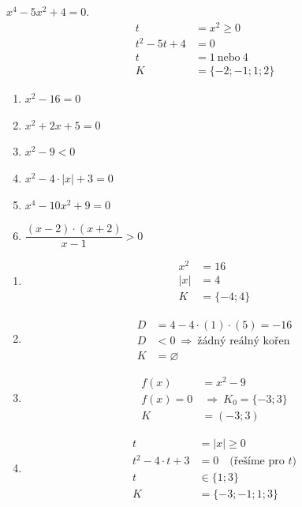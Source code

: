 \documentclass[11pt,a4paper]{article}
\begin{document}
\begin{zadaniReseniBox}[title={Rozšíření 2}]
$x^4-5x^2+4=0$.
\tcblower
\[\begin{aligned}
t&=x^2\ge0\\t^2-5t+4&=0\\t&=1\ \text{nebo}\ 4\\K&=\{-2;-1;1;2\}
\end{aligned}\]
\end{zadaniReseniBox}
\begin{zadaniReseniBox}[title={Domácí úkol}]
\begin{enumerate}[label=\alph*),itemsep=2pt]
\item $x^{2} - 16=0$
\item $x^{2} + 2x + 5=0$
\item $x^{2} - 9<0$
\item $x^{2} - 4 \cdot \left|{x}\right| + 3=0$
\item $x^{4} - 10x^{2} + 9=0$
\item $\dfrac{\left(x - 2\right) \cdot \left(x + 2\right)}{x - 1}>0$
\end{enumerate}
\tcblower
\begin{enumerate}[label=\alph*),itemsep=2pt]
\item
\[\begin{aligned}
x^2&=16\\|x|&=4\\[2pt]
K&=\{-4;4\}
\end{aligned}\]
\item
\[\begin{aligned}
D&=4-4\cdot(1)\cdot(5)=-16\\[2pt]
D&<0\ \Rightarrow\ \text{žádný reálný kořen}\\[2pt]
K&=\varnothing
\end{aligned}\]
\item
\[\begin{aligned}
f(x)&=x^{2} - 9\\[2pt]
f(x)=0&\ \Rightarrow\ K_0=\{-3;3\}\\[2pt]
K&=(-3;3)
\end{aligned}\]
\item
\[\begin{aligned}
t&=|x|\ge0\\[2pt]
t^{2} - 4 \cdot t + 3&=0\quad\text{(řešíme pro }t\text{)}\\[2pt]
t&\in \{1;3\}\\[2pt]
K&=\{-3;-1;1;3\}
\end{aligned}\]

\end{enumerate}
\end{zadaniReseniBox}
\end{document}
